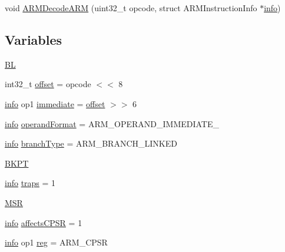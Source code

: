 \begin{DoxyCompactItemize}
\item 
void \mbox{\hyperlink{decoder-arm_8c_ae0a328e9d3c32fcaa891021b7e6aee89}{A\+R\+M\+Decode\+A\+RM}} (uint32\+\_\+t opcode, struct A\+R\+M\+Instruction\+Info $\ast$\mbox{\hyperlink{libretro_8h_a283ad41e4809f9c0ebe736a9861d8a91}{info}})
\end{DoxyCompactItemize}
\subsection*{Variables}
\begin{DoxyCompactItemize}
\item 
\mbox{\hyperlink{decoder-arm_8c_adafdf5f045e21581219028370836474d}{BL}}
\item 
int32\+\_\+t \mbox{\hyperlink{decoder-arm_8c_a97bd6c077f3c7769f575b82988b9b668}{offset}} = opcode $<$$<$ 8
\item 
\mbox{\hyperlink{libretro_8h_a283ad41e4809f9c0ebe736a9861d8a91}{info}} op1 \mbox{\hyperlink{decoder-arm_8c_a8bc2501cb64b3bc9ac59754cfafb68d1}{immediate}} = \mbox{\hyperlink{ioapi_8h_a601c4660e8a1a14a1b87fe387e934d19}{offset}} $>$$>$ 6
\item 
\mbox{\hyperlink{libretro_8h_a283ad41e4809f9c0ebe736a9861d8a91}{info}} \mbox{\hyperlink{decoder-arm_8c_a52313e50f86644324806d9228ecd8472}{operand\+Format}} = A\+R\+M\+\_\+\+O\+P\+E\+R\+A\+N\+D\+\_\+\+I\+M\+M\+E\+D\+I\+A\+T\+E\+\_
\item 
\mbox{\hyperlink{libretro_8h_a283ad41e4809f9c0ebe736a9861d8a91}{info}} \mbox{\hyperlink{decoder-arm_8c_a8dbbd417010e59d26bfaf79cb6139102}{branch\+Type}} = A\+R\+M\+\_\+\+B\+R\+A\+N\+C\+H\+\_\+\+L\+I\+N\+K\+ED
\item 
\mbox{\hyperlink{decoder-arm_8c_ada39db97dab5656c737ecdd20e83feca}{B\+K\+PT}}
\item 
\mbox{\hyperlink{libretro_8h_a283ad41e4809f9c0ebe736a9861d8a91}{info}} \mbox{\hyperlink{decoder-arm_8c_afe08430c255629bed908d9bf22397277}{traps}} = 1
\item 
\mbox{\hyperlink{decoder-arm_8c_ad9c5d760c45ba502ddfe54752058d02e}{M\+SR}}
\item 
\mbox{\hyperlink{libretro_8h_a283ad41e4809f9c0ebe736a9861d8a91}{info}} \mbox{\hyperlink{decoder-arm_8c_a341974b1ace4c6e318affa9525002ccd}{affects\+C\+P\+SR}} = 1
\item 
\mbox{\hyperlink{libretro_8h_a283ad41e4809f9c0ebe736a9861d8a91}{info}} op1 \mbox{\hyperlink{decoder-arm_8c_af44c02f7785479603f59b662f3dfae6a}{reg}} = A\+R\+M\+\_\+\+C\+P\+SR
\item 

\end{DoxyCompactItemize}
